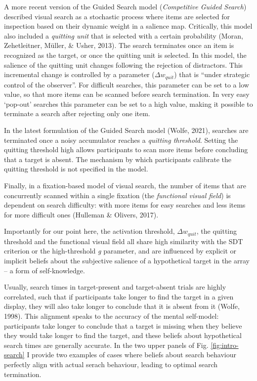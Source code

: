 \documentclass[12pt,twoside]{reedthesis}
\begin{document}
A more recent version of the Guided Search model (\emph{Competitive Guided Search}) described visual search as a stochastic process where items are selected for inspection based on their dynamic weight in a salience map. Critically, this model also included a \emph{quitting unit} that is selected with a certain probability (Moran, Zehetleitner, Müller, \& Usher, 2013). The search terminates once an item is recognized as the target, or once the quitting unit is selected. In this model, the salience of the quitting unit changes following the rejection of distractors. This incremental change is controlled by a parameter (\(\Delta w_{quit}\)) that is ``under strategic control of the observer''. For difficult searches, this parameter can be set to a low value, so that more items can be scanned before search termination. In very easy `pop-out' searches this parameter can be set to a high value, making it possible to terminate a search after rejecting only one item.

In the latest formulation of the Guided Search model (Wolfe, 2021), searches are terminated once a noisy accumulator reaches a \emph{quitting threshold}. Setting the quitting threshold high allows participants to scan more items before concluding that a target is absent. The mechanism by which participants calibrate the quitting threshold is not specified in the model.

Finally, in a fixation-based model of visual search, the number of items that are concurrently scanned within a single fixation (the \emph{functional visual field}) is dependent on search difficulty: with more items for easy searches and less items for more difficult ones (Hulleman \& Olivers, 2017).

Importantly for our point here, the activation threshold, \(\Delta w_{quit}\), the quitting threshold and the functional visual field all share high similarity with the SDT criterion or the high-threshold \emph{g} parameter, and are influenced by explicit or implicit beliefs about the subjective salience of a hypothetical target in the array -- a form of self-knowledge.

Usually, search times in target-present and target-absent trials are highly correlated, such that if participants take longer to find the target in a given display, they will also take longer to conclude that it is absent from it (Wolfe, 1998). This alignment speaks to the accuracy of the mental self-model: participants take longer to conclude that a target is missing when they believe they would take longer to find the target, and these beliefs about hypothetical search times are generally accurate. In the two upper panels of Fig. \ref{fig:intro-search} I provide two examples of cases where beliefs about search behaviour perfectly align with actual serach behaviour, leading to optimal search termination.
\end{document}
